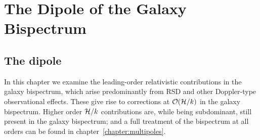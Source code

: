 \chapter{The Dipole of the Galaxy Bispectrum}
\label{chapter:dipole}

\section{The dipole}

In this chapter we examine the leading-order relativistic contributions in the galaxy bispectrum, which arise predominantly from RSD and other Doppler-type observational effects. These give rise to corrections at $\mathcal{O}(\mathcal{H}/k)$ in the galaxy bispectrum. Higher order $\mathcal{H}/k$ contributions are, while being subdominant, still present in the galaxy bispectrum; and a full treatment of the bispectrum at all orders can be found in chapter~\ref{chapter:multipoles}.


